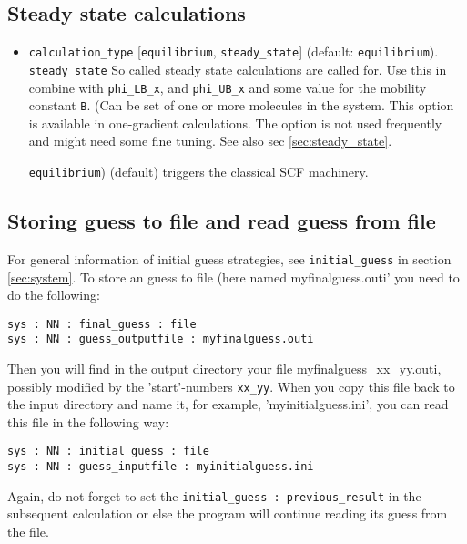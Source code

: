 \documentclass{article}
\begin{document}
\subsection {Steady state calculations}
\begin{itemize}
\item {\tt calculation\_type} [{\tt equilibrium}, {\tt steady\_state}] (default: {\tt equilibrium}).
{\tt steady\_state} So called steady state calculations are called for. Use this in combine with {\tt phi\_LB\_x}, and {\tt phi\_UB\_x} and some value for the mobility constant {\tt B}. (Can be set of one or more molecules in the system. This option is available in one-gradient calculations. The option is not used frequently and might need some fine tuning. See also sec \ref{sec:steady_state}.

{\tt equilibrium}) (default) triggers the classical SCF machinery. 
\end{itemize}



\subsection{Storing guess to file and read guess from file}
\label{sec:initialguess}
For general information of initial guess strategies, see {\tt  initial\_guess} in section \ref{sec:system}.
To store an guess to file (here named myfinalguess.outi' you need to do the following:
\begin{verbatim}
sys : NN : final_guess : file
sys : NN : guess_outputfile : myfinalguess.outi
\end{verbatim}
Then you will find in the output directory your file myfinalguess\_xx\_yy.outi, possibly modified by the 'start'-numbers {\tt xx\_yy}. When you copy this file back to the input directory and name it, for example, 'myinitialguess.ini', you can read this file in the following way:
\begin{verbatim}
sys : NN : initial_guess : file
sys : NN : guess_inputfile : myinitialguess.ini
\end{verbatim}
Again, do not forget to set the {\tt initial\_guess : previous\_result} in the subsequent calculation or else the program will continue reading its guess from the file. 
\end{document}
